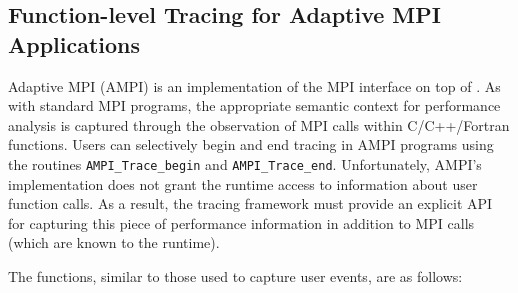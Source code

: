 \subsection{Function-level Tracing for Adaptive MPI Applications}
\label{sec::AMPI functions}

Adaptive MPI (AMPI) is an implementation of the MPI interface on top
of \charmpp{}. As with standard MPI programs, the appropriate semantic
context for performance analysis is captured through the observation
of MPI calls within C/C++/Fortran functions. Users can selectively begin
and end tracing in AMPI programs using the routines \texttt{AMPI\_Trace\_begin}
and \texttt{AMPI\_Trace\_end}. Unfortunately, AMPI's
implementation does not grant the runtime access to information about
user function calls. As a result, the tracing framework must provide
an explicit API for capturing this piece of performance information in
addition to MPI calls (which are known to the runtime).

The functions, similar to those used to capture user events, are as
follows:


